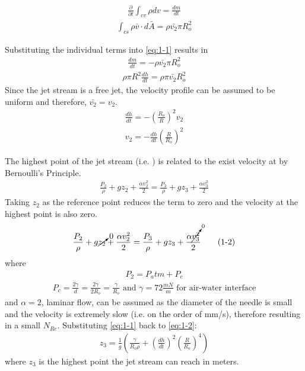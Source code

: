 \documentclass{article}
\newcommand*\circled[1]{\tikz[baseline=(char.base)]{
            \node[shape=circle,draw,inner sep=2pt] (char) {#1};}}
\begin{document}
\begin{align*}
\frac{\partial}{\partial{t}} \int_{cv} \rho dv = \frac{dm}{dt}
\end{align*}
\begin{align*}
\int_{cs} \rho \bar{v} \cdot d\bar{A} = \rho \bar{v_2} \pi R_o^2
\end{align*}

Substituting the individual terms into \eqref{eq:1-1} results in
\begin{align*}
\frac{dm}{dt} = - \rho \bar{v_2} \pi R_o^2
\end{align*}
\begin{align*}
\rho \pi R^2 \frac{dh}{dt} = \rho \pi \bar{v_2} R_o^2
\end{align*}
Since the jet stream is a free jet, the velocity profile can be assumed to be uniform and therefore, $\bar{v_2} = v_2$.
\begin{align*}
\frac{dh}{dt} = -(\frac{R_o}{R})^2 v_2
\end{align*}
\begin{align*}
v_2 = -\frac{dh}{dt} (\frac{R}{R_o})^2
\end{align*}

The highest point of the jet stream (i.e. \circled{3}) is related to the exist velocity at \circled{2} by Bernoulli's Principle.
\begin{align*}
\frac{P_2}{\rho} + g z_2 + \frac{\alpha v_2^2}{2} = \frac{P_3}{\rho} + g z_3 + \frac{\alpha v_3^2}{2} 
\end{align*}
Taking $z_2$ as the reference point reduces the term to zero and the velocity at the highest point is also zero.
\begin{align*}
\frac{P_2}{\rho} + g \cancelto{0}{z_2} + \frac{\alpha v_2^2}{2} = \frac{P_3}{\rho} + g z_3 + \frac{\alpha \cancelto{0}{v_3^2}}{2} \label{eq:1-2} \tag{1-2}
\end{align*}
where
\begin{align*}
P_2 = P_atm + P_c
\end{align*}
\begin{align*}
P_c = \frac{2\gamma}{d} = \frac{2\gamma}{2 R_o} = \frac{\gamma}{R_o}  \textrm{ and } \gamma = 72 \frac{mN}{m}  \textrm{ for air-water interface}
\end{align*}
and $\alpha = 2$, laminar flow, can be assumed as the diameter of the needle is small and the velocity is extremely slow (i.e. on the order of mm/s), therefore resulting in a small $N_{Re}$. Substituting \eqref{eq:1-1} back to \eqref{eq:1-2}:
\begin{align*}
z_3 = \frac{1}{g} (\frac{\gamma}{R_o \rho} + (\frac{dh}{dt})^2(\frac{R}{R_o})^4)  \label{eq:1-3} \tag{1-3}
\end{align*}
where $z_3$ is the highest point the jet stream can reach in meters.
\end{document}
